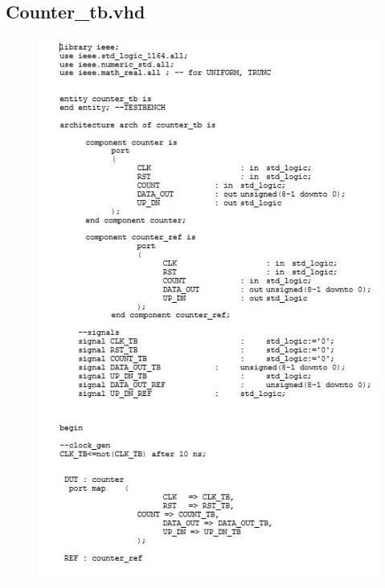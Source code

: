 \subsection{Counter\_tb.vhd}
\begin{figure}[!htb]
	\centering
	\includegraphics[scale=1]{immagini/counter_tb1}
	\label{counter_tb1}
\end{figure}

